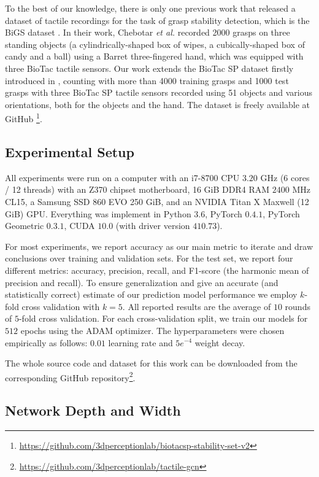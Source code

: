 To the best of our knowledge, there is only one previous work that released a dataset of tactile recordings for the task of grasp stability detection, which is the BiGS dataset \cite{Chebotar2016bigs}. In their work, Chebotar \emph{et al.} recorded 2000 grasps on three standing objects (a cylindrically-shaped box of wipes, a cubically-shaped box of candy and a ball) using a Barret three-fingered hand, which was equipped with three BioTac tactile sensors. Our work extends the BioTac SP
dataset firstly introduced in \cite{Zapata2018}, counting with more than 4000 training grasps and 1000 test grasps with three BioTac SP tactile sensors recorded using 51 objects and various orientations, both for the objects and the hand. The dataset is freely available at GitHub \footnote{\url{https://github.com/3dperceptionlab/biotacsp-stability-set-v2}}.

\subsection{Experimental Setup}

All experiments were run on a computer with an i7-8700 CPU \@ $3.20$ GHz (6 cores / 12 threads) with an Z370 chipset motherboard, 16 GiB DDR4 RAM \@ $2400$ MHz CL15, a Samsung SSD 860 EVO 250 GiB, and an NVIDIA Titan X Maxwell (12 GiB) GPU. Everything was implement in Python $3.6$, PyTorch $0.4.1$, PyTorch Geometric $0.3.1$, CUDA $10.0$ (with driver version $410.73$).

For most experiments, we report accuracy as our main metric to iterate and draw conclusions over training and validation sets. For the test set, we report four different metrics: accuracy, precision, recall, and F1-score (the harmonic mean of precision and recall). To ensure generalization and give an accurate (and statistically correct) estimate of our prediction model performance we employ $k$-fold cross validation with $k=5$. All reported results are the average of $10$ rounds of $5$-fold cross validation. For each cross-validation split, we train our models for $512$ epochs using the ADAM optimizer. The hyperparameters were chosen empirically as follows: $0.01$ learning rate and $5e^{-4}$ weight decay.

The whole source code and dataset for this work can be downloaded from the corresponding GitHub repository\footnote{\url{https://github.com/3dperceptionlab/tactile-gcn}}.

\subsection{Network Depth and Width}

